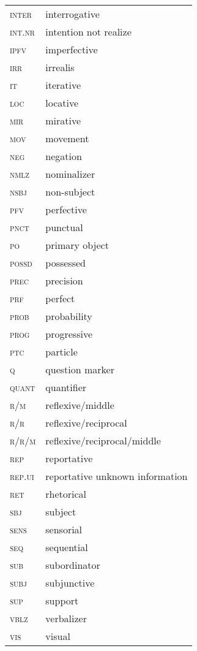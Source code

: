 \documentclass[output=paper]{langsci/langscibook}
\begin{document}
\begin{tabularx}{.5\textwidth}{lQ}
    \textsc{inter}& interrogative\\
    \textsc{int.nr}& intention not realize\\ 
    \textsc{ipfv}& imperfective\\ 
    \textsc{irr}& irrealis\\ 
    \textsc{it}& iterative\\ 
    \textsc{loc}& locative\\ 
    \textsc{mir}& mirative\\
    \textsc{mov}& movement\\ 
    \textsc{neg}& negation\\ 
    \textsc{nmlz}& nominalizer\\ 
    \textsc{nsbj}& non-subject\\ 
    \textsc{pfv}& perfective\\ 
    \textsc{pnct}& punctual\\ 
    \textsc{po}& primary object\\ 
    \textsc{possd}& possessed\\ 
    \textsc{prec}& precision\\ 
    \textsc{prf}& perfect\\ 
    \textsc{prob}& probability\\ 
    \textsc{prog}& progressive\\ 
    \textsc{ptc}& particle\\ 
    \textsc{q}& question marker\\ 
    \textsc{quant}& quantifier\\ 
    \textsc{r/m}& reflexive/middle\\ 
    \textsc{r/r}& reflexive/reciprocal\\ 
    \textsc{r/r/m}& reflexive/reciprocal/middle\\ 
    \textsc{rep}& reportative\\
    \textsc{rep.ui}& reportative unknown information\\
    \textsc{ret}& rhetorical\\ 
    \textsc{sbj}& subject\\ 
    \textsc{sens}& sensorial\\ 
    \textsc{seq}& sequential\\ 
    \textsc{sub}& subordinator\\ 
    \textsc{subj}& subjunctive\\ 
    \textsc{sup}& support\\ 
    \textsc{vblz}& verbalizer\\
    \textsc{vis}& visual\\
\end{tabularx}
\end{document}

